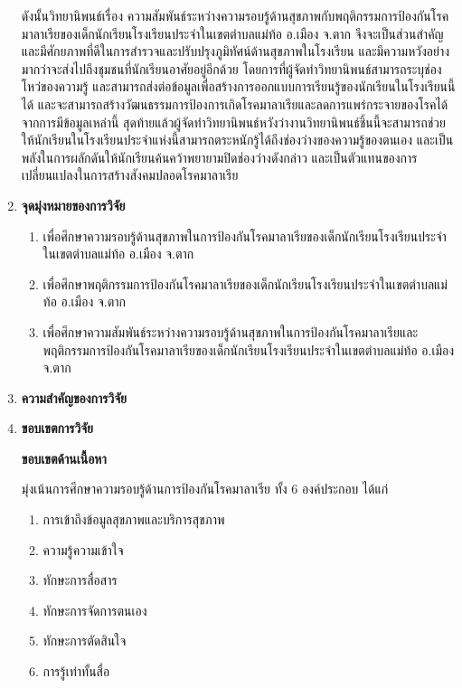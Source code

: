 \begin{titlepage}
\begin{enumerate}
          ดังนั้นวิทยานิพนธ์เรื่อง ความสัมพันธ์ระหว่างความรอบรู้ด้านสุขภาพกับพฤติกรรมการป้องกันโรคมาลาเรียของเด็กนักเรียนโรงเรียนประจำในเขตตำบลแม่ท้อ อ.เมือง จ.ตาก จึงจะเป็นส่วนสำคัญ และมีศักยภาพที่ดีในการสำรวจและปรับปรุงภูมิทัศน์ด้านสุขภาพในโรงเรียน และมีความหวังอย่างมากว่าจะส่งไปถึงชุมชนที่นักเรียนอาศัยอยู่อีกด้วย โดยการที่ผู้จัดทำวิทยานิพนธ์สามารถระบุช่องโหว่ของความรู้ และสามารถส่งต่อข้อมูลเพื่อสร้างการออกแบบการเรียนรู้ของนักเรียนในโรงเรียนนี้ได้ และจะสามารถสร้างวัฒนธรรมการป้องการเกิดโรคมาลาเรียและลดการแพร่กระจายของโรคได้จากการมีข้อมูลเหล่านี้ สุดท้ายแล้วผู้จัดทำวิทยานิพนธ์หวังว่างานวิทยานิพนธ์ชิ้นนี้จะสามารถช่วยให้นักเรียนในโรงเรียนประจำแห่งนี้สามารถตระหนักรู้ได้ถึงช่องว่างของความรู้ของตนเอง และเป็นพลังในการผลักดันให้นักเรียนค้นคว้าพยายามปิดช่องว่างดังกล่าว และเป็นตัวแทนของการเปลี่ยนแปลงในการสร้างสังคมปลอดโรคมาลาเรีย


          \item\textbf{จุดมุ่งหมายของการวิจัย}
          \begin{enumerate}
            \item เพื่อศึกษาความรอบรู้ด้านสุขภาพในการป้องกันโรคมาลาเรียของเด็กนักเรียนโรงเรียนประจำในเขตตำบลแม่ท้อ อ.เมือง จ.ตาก
            \item เพื่อศึกษาพฤติกรรมการป้องกันโรคมาลาเรียของเด็กนักเรียนโรงเรียนประจำในเขตตำบลแม่ท้อ อ.เมือง จ.ตาก
            \item เพื่อศึกษาความสัมพันธ์ระหว่างความรอบรู้ด้านสุขภาพในการป้องกันโรคมาลาเรียและพฤติกรรมการป้องกันโรคมาลาเรียของเด็กนักเรียนโรงเรียนประจำในเขตตำบลแม่ท้อ อ.เมือง จ.ตาก
          \end{enumerate}

          \item\textbf{ความสำคัญของการวิจัย}

          \item\textbf{ขอบเขตการวิจัย}

          \textbf{ขอบเขตด้านเนื้อหา}

          มุ่งเน้นการศึกษาความรอบรู้ด้านการป้องกันโรคมาลาเรีย ทั้ง 6 องค์ประกอบ ได้แก่
          \begin{enumerate}[itemindent=4em, label=\textnormal{\arabic*.}]
            \item การเข้าถึงข้อมูลสุขภาพและบริการสุขภาพ
            \item ความรู้ความเข้าใจ
            \item ทักษะการสื่อสาร
            \item ทักษะการจัดการตนเอง
            \item ทักษะการตัดสินใจ
            \item การรู้เท่าทั้นสื่อ
          \end{enumerate}


\end{enumerate}
\end{titlepage}
